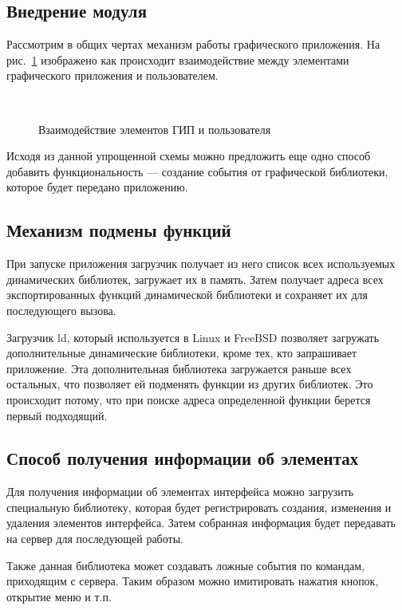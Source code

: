 \subsection{Внедрение модуля}

Рассмотрим в общих чертах механизм работы графического приложения. На
рис.~\ref{fig:gui} изображено как происходит взаимодействие между элементами
графического приложения и пользователем.

\begin{figure}
	\centering
	\\
	\caption{Взаимодействие элементов ГИП и пользователя}\label{fig:gui}
\end{figure}

Исходя из данной упрощенной схемы можно предложить еще одно способ добавить
функциональность — создание события от графической библиотеки, которое будет
передано приложению.

\subsection{Механизм подмены функций}

При запуске приложения загрузчик получает из него список всех используемых
динамических библиотек, загружает их в память. Затем получает адреса всех
экспортированных функций динамической библиотеки и сохраняет их для последующего
вызова.

Загрузчик ld, который используется в Linux и FreeBSD позволяет загружать
дополнительные динамические библиотеки, кроме тех, кто запрашивает приложение.
Эта дополнительная библиотека загружается раньше всех остальных, что позволяет
ей подменять функции из других библиотек. Это происходит потому, что при поиске
адреса определенной функции берется первый подходящий.

\subsection{Способ получения информации об элементах}

Для получения информации об элементах интерфейса можно загрузить специальную
библиотеку, которая будет регистрировать создания, изменения и удаления
элементов интерфейса. Затем собранная информация будет передавать на сервер для
последующей работы.

Также данная библиотека может создавать ложные события по командам, приходящим с
сервера. Таким образом можно имитировать нажатия кнопок, открытие меню и т.п.


